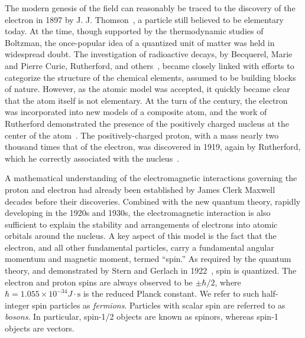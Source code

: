 The modern genesis of the field can reasonably be traced to 
the discovery of the electron in 1897 by J. J. Thomson~\cite{doi:10.1080/14786449708621070}, a particle still
believed to be elementary today.
At the time, though supported by the thermodynamic studies of Boltzman,
the once-popular idea of a quantized unit of matter was
held in widespread doubt. 
The investigation of radioactive decays, by Becquerel,
Marie and Pierre Curie, Rutherford, and others~\cite{RADVANYI2017544}, 
became closely linked with efforts to categorize
the structure of the chemical elements, assumed to be
building blocks of nature. 
However, as the atomic model was accepted, 
it quickly became clear that the atom itself is not elementary.
At the turn of the century, the electron was incorporated into 
new models of a composite atom, and
the work of Rutherford demonstrated the presence of the
positively charged nucleus at the center of the atom~\cite{Rutherford:1911zz}.
The positively-charged proton, with a mass nearly two thousand times
that of the electron, was discovered in 1919, again by Rutherford,
which he correctly associated with the 
nucleus~\cite{doi:10.1080/14786440608635919}.

A mathematical understanding of the electromagnetic interactions 
governing the proton and electron had
already been established by James Clerk Maxwell decades before their discoveries.
Combined with the new quantum theory, rapidly developing in the 1920s and 1930s, the electromagnetic
interaction is also sufficient to explain the stability and arrangements of
electrons into atomic orbitals around the nucleus. 
A key aspect of this model is the fact that the electron, and all other
fundamental particles, carry a fundamental
angular momentum and magnetic moment, termed ``spin.'' 
As required by the quantum theory, and 
demonstrated by Stern and Gerlach in 1922~\cite{1922ZPhy....9..349G},
spin is quantized.
The electron and proton spins are always observed to be $\pm\hbar/2$, where 
$\hbar=1.055\times 10^{-34}\unit{J}\cdot\mathrm{s}$
is the reduced Planck constant.
We refer to such half-integer spin particles as \emph{fermions}. Particles
with scalar spin are referred to as \emph{bosons}. In particular, spin-1/2 objects
are known as spinors, whereas spin-1 objects are vectors.

